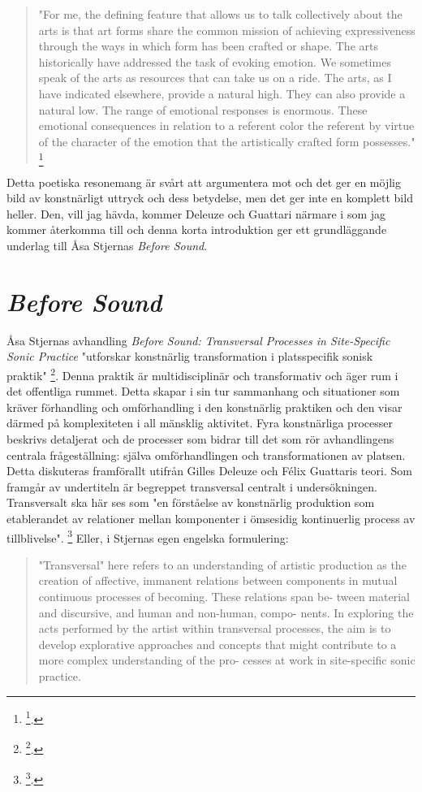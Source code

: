 \documentclass[11pt]{article}
\begin{document}
\begin{quote}
"For me, the defining feature that allows us to talk collectively
about the arts is that art forms share the common mission of achieving
expressiveness through the ways in which form has been crafted or
shape. The arts historically have addressed the task of evoking
emotion. We sometimes speak of the arts as resources that can take us
on a ride. The arts, as I have indicated elsewhere, provide a natural
high. They can also provide a natural low. The range of emotional
responses is enormous. These emotional consequences in relation to a
referent color the referent by virtue of the character of the emotion
that the artistically crafted form possesses." \footnote{\footcite{Eisner2008}.}
\end{quote}

Detta poetiska resonemang är svårt att argumentera mot och det ger en
möjlig bild av konstnärligt uttryck och dess betydelse, men det ger inte
en komplett bild heller. Den, vill jag hävda, kommer Deleuze och
Guattari närmare i som jag kommer återkomma till och denna korta
introduktion ger ett grundläggande underlag till Åsa Stjernas \emph{Before
Sound}.

\section{\emph{Before Sound}}
\label{sec:org050dcf4}
Åsa Stjernas avhandling \emph{Before Sound: Transversal Processes in
Site-Specific Sonic Practice} "utforskar konstnärlig transformation i
platsspecifik sonisk praktik" \footnote{\footcite[s.291]{Stjerna2018}.}. Denna praktik är multidisciplinär
och transformativ och äger rum i det offentliga rummet. Detta skapar i
sin tur sammanhang och situationer som kräver förhandling och
omförhandling i den konstnärlig praktiken och den visar därmed på
komplexiteten i all mänsklig aktivitet. Fyra konstnärliga processer
beskrivs detaljerat och de processer som bidrar till det som rör
avhandlingens centrala frågeställning: själva omförhandlingen och
transformationen av platsen. Detta diskuteras framförallt utifrån Gilles
Deleuze och Félix Guattaris teori. Som framgår av undertiteln är
begreppet transversal centralt i undersökningen. Transversalt ska här
ses som "en förståelse av konstnärlig produktion som etablerandet av
relationer mellan komponenter i ömsesidig kontinuerlig process av
tillblivelse". \footnote{\footcite[s.293]{Stjerna2018}.} Eller, i Stjernas egen engelska formulering:

\begin{quote}
"Transversal" here refers to an understanding of artistic production
as the creation of affective, immanent relations between components in
mutual continuous processes of becoming. These relations span be-
tween material and discursive, and human and non-human, compo- nents.
In exploring the acts performed by the artist within transversal
processes, the aim is to develop explorative approaches and concepts
that might contribute to a more complex understanding of the pro-
cesses at work in site-specific sonic practice.
\end{quote}
\end{document}

